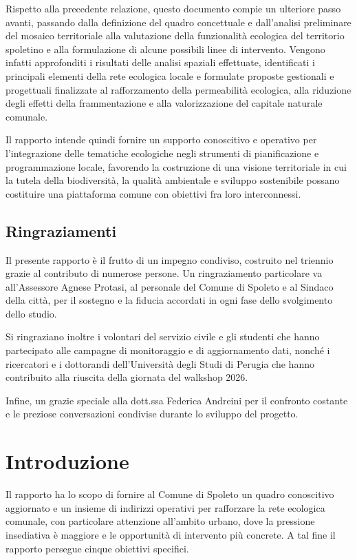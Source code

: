 \documentclass[
  a4paper,
]{book}
\begin{document}
Rispetto alla precedente relazione, questo documento compie un ulteriore passo avanti, passando dalla definizione del quadro concettuale e dall'analisi preliminare del mosaico territoriale alla valutazione della funzionalità ecologica del territorio spoletino e alla formulazione di alcune possibili linee di intervento.
Vengono infatti approfonditi i risultati delle analisi spaziali effettuate, identificati i principali elementi della rete ecologica locale e formulate proposte gestionali e progettuali finalizzate al rafforzamento della permeabilità ecologica, alla riduzione degli effetti della frammentazione e alla valorizzazione del capitale naturale comunale.

Il rapporto intende quindi fornire un supporto conoscitivo e operativo per l'integrazione delle tematiche ecologiche negli strumenti di pianificazione e programmazione locale, favorendo la costruzione di una visione territoriale in cui la tutela della biodiversità, la qualità ambientale e sviluppo sostenibile possano costituire una piattaforma comune con obiettivi fra loro interconnessi.

\section{Ringraziamenti}\label{ringraziamenti}

Il presente rapporto è il frutto di un impegno condiviso, costruito nel triennio grazie al contributo di numerose persone.
Un ringraziamento particolare va all'Assessore Agnese Protasi, al personale del Comune di Spoleto e al Sindaco della città, per il sostegno e la fiducia accordati in ogni fase dello svolgimento dello studio.

Si ringraziano inoltre i volontari del servizio civile e gli studenti che hanno partecipato alle campagne di monitoraggio e di aggiornamento dati, nonché i ricercatori e i dottorandi dell'Università degli Studi di Perugia che hanno contribuito alla riuscita della giornata del walkshop 2026.

Infine, un grazie speciale alla dott.ssa Federica Andreini per il confronto costante e le preziose conversazioni condivise durante lo sviluppo del progetto.

\chapter{Introduzione}\label{introduzione}

Il rapporto ha lo scopo di fornire al Comune di Spoleto un quadro conoscitivo aggiornato e un insieme di indirizzi operativi per rafforzare la rete ecologica comunale, con particolare attenzione all'ambito urbano, dove la pressione insediativa è maggiore e le opportunità di intervento più concrete.
A tal fine il rapporto persegue cinque obiettivi specifici.
\end{document}
